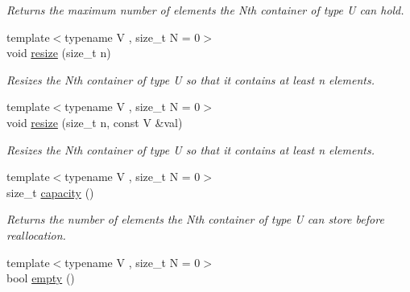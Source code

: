\begin{DoxyCompactItemize}
\begin{DoxyCompactList}\small\item\em Returns the maximum number of elements the Nth container of type U can hold. \end{DoxyCompactList}\item 
\hypertarget{classheterogeneous_1_1heterovector_3_01_t_00_01_u_00_01_types_8_8_8_4_a3e4c16dfb840dec7ffa6eab716de9fae}{}{\footnotesize template$<$typename V , size\+\_\+t N = 0$>$ }\\void \hyperlink{classheterogeneous_1_1heterovector_3_01_t_00_01_u_00_01_types_8_8_8_4_a3e4c16dfb840dec7ffa6eab716de9fae}{resize} (size\+\_\+t n)\label{classheterogeneous_1_1heterovector_3_01_t_00_01_u_00_01_types_8_8_8_4_a3e4c16dfb840dec7ffa6eab716de9fae}

\begin{DoxyCompactList}\small\item\em Resizes the Nth container of type U so that it contains at least n elements. \end{DoxyCompactList}\item 
\hypertarget{classheterogeneous_1_1heterovector_3_01_t_00_01_u_00_01_types_8_8_8_4_aff39569c74055eb9b2fc3861fc64548e}{}{\footnotesize template$<$typename V , size\+\_\+t N = 0$>$ }\\void \hyperlink{classheterogeneous_1_1heterovector_3_01_t_00_01_u_00_01_types_8_8_8_4_aff39569c74055eb9b2fc3861fc64548e}{resize} (size\+\_\+t n, const V \&val)\label{classheterogeneous_1_1heterovector_3_01_t_00_01_u_00_01_types_8_8_8_4_aff39569c74055eb9b2fc3861fc64548e}

\begin{DoxyCompactList}\small\item\em Resizes the Nth container of type U so that it contains at least n elements. \end{DoxyCompactList}\item 
\hypertarget{classheterogeneous_1_1heterovector_3_01_t_00_01_u_00_01_types_8_8_8_4_a9e0ebbfc26c5f27ca58f68693ba2ca52}{}{\footnotesize template$<$typename V , size\+\_\+t N = 0$>$ }\\size\+\_\+t \hyperlink{classheterogeneous_1_1heterovector_3_01_t_00_01_u_00_01_types_8_8_8_4_a9e0ebbfc26c5f27ca58f68693ba2ca52}{capacity} ()\label{classheterogeneous_1_1heterovector_3_01_t_00_01_u_00_01_types_8_8_8_4_a9e0ebbfc26c5f27ca58f68693ba2ca52}

\begin{DoxyCompactList}\small\item\em Returns the number of elements the Nth container of type U can store before reallocation. \end{DoxyCompactList}\item 
\hypertarget{classheterogeneous_1_1heterovector_3_01_t_00_01_u_00_01_types_8_8_8_4_a6ed3966b2fb1f556c82325bbf29368ba}{}{\footnotesize template$<$typename V , size\+\_\+t N = 0$>$ }\\bool \hyperlink{classheterogeneous_1_1heterovector_3_01_t_00_01_u_00_01_types_8_8_8_4_a6ed3966b2fb1f556c82325bbf29368ba}{empty} ()\label{classheterogeneous_1_1heterovector_3_01_t_00_01_u_00_01_types_8_8_8_4_a6ed3966b2fb1f556c82325bbf29368ba}


\end{DoxyCompactItemize}
